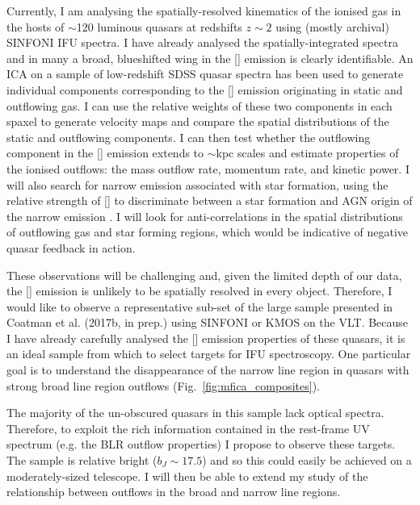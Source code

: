 Currently, I am analysing the spatially-resolved kinematics of the ionised gas in the hosts of $\sim$120 luminous quasars at redshifts $z\sim2$ using (mostly archival) SINFONI IFU spectra. 
I have already analysed the spatially-integrated spectra and in many a broad, blueshifted wing in the [] emission is clearly identifiable. 
An ICA on a sample of low-redshift SDSS quasar spectra has been used to generate individual components corresponding to the [] emission originating in static and outflowing gas. 
I can use the relative weights of these two components in each spaxel to generate velocity maps and compare the spatial distributions of the static and outflowing components.
I can then test whether the outflowing component in the [] emission extends to $\sim$kpc scales and
estimate properties of the ionised outflows: the mass outflow rate, momentum rate, and kinetic power.
I will also search for narrow \ha emission associated with star formation, using the relative strength of [] to discriminate between a star formation and AGN origin of the narrow \ha emission \citep{susie16}. 
I will look for anti-correlations in the spatial distributions of outflowing gas and star forming regions, which would be indicative of negative quasar feedback in action.

These observations will be challenging and, given the limited depth of our data, the [] emission is unlikely to be spatially resolved in every object. 
Therefore, I would like to observe a representative sub-set of the large sample presented in Coatman et al. (2017b, in prep.) using SINFONI or KMOS on the VLT. 
Because I have already carefully analysed the [] emission properties of these quasars, it is an ideal sample from which to select targets for IFU spectroscopy. 
One particular goal is to understand the disappearance of the narrow line region in quasars with strong broad line region outflows (Fig.~\ref{fig:mfica_composites}). 

The majority of the un-obscured quasars in this sample lack optical spectra. 
Therefore, to exploit the rich information contained in the rest-frame UV spectrum (e.g. the BLR outflow properties) I propose to observe these targets. 
The sample is relative bright ($b_J\sim17.5$) and so this could easily be achieved on a moderately-sized telescope. 
I will then be able to extend my study of the relationship between outflows in the broad and narrow line regions. 


